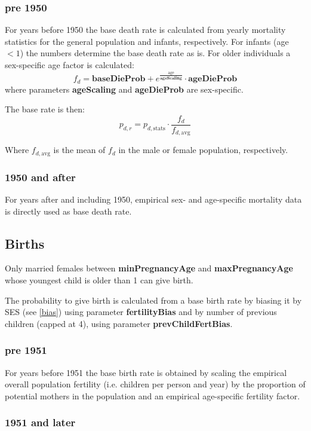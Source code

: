 \documentclass{article}
\begin{document}
\subsubsection*{pre 1950}

For years before 1950 the base death rate is calculated from yearly mortality statistics for the general population and infants, respectively. For infants (age $< 1$) the numbers determine the base death rate as is. For older individuals a sex-specific age factor is calculated:
\[
f_d =\mathbf{baseDieProb} + e^\frac{\textrm{age}}{\mathbf{ageScaling}} \cdot \mathbf{ageDieProb}
\]
where parameters \textbf{ageScaling} and \textbf{ageDieProb} are sex-specific.

The base rate is then:
\[
p_{d,r} = p_{d,\mathrm{stats}} \cdot \frac{f_d}{f_{d,\mathrm{avg}}} 
\]

Where $f_{d,\mathrm{avg}}$ is the mean of $f_d$ in the male or female population, respectively.

\subsubsection*{1950 and after}

For years after and including 1950, empirical sex- and age-specific mortality data is directly used as base death rate.


\subsection{Births}

Only married females between \textbf{minPregnancyAge} and \textbf{maxPregnancyAge} whose youngest child is older than 1 can give birth.

The probability to give birth is calculated from a base birth rate by biasing it by SES (see \ref{bias}) using parameter \textbf{fertilityBias} and by number of previous children (capped at 4), using parameter \textbf{prevChildFertBias}.

\subsubsection*{pre 1951}

For years before 1951 the base birth rate is obtained by scaling the empirical overall population fertility (i.e. children per person and year) by the proportion of potential mothers in the population and an empirical age-specific fertility factor.

\subsubsection*{1951 and later}
\end{document}
